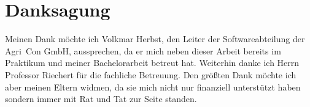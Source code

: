 \chapter*{Danksagung}
\label{sec:Danksagung}
Meinen Dank möchte ich Volkmar Herbst, den Leiter der Softwareabteilung der Agri~Con GmbH, aussprechen, da er mich neben dieser Arbeit bereits im Praktikum und meiner Bachelorarbeit betreut hat.
Weiterhin danke ich Herrn Professor Riechert für die fachliche Betreuung.
Den größten Dank möchte ich aber meinen Eltern widmen, da sie mich nicht nur finanziell unterstützt haben sondern immer mit Rat und Tat zur Seite standen.